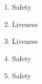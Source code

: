 \section{}
\begin{enumerate}
    \item Safety
    \item Liveness
    \item Liveness
    \item Safety
    \item Safety
\end{enumerate}